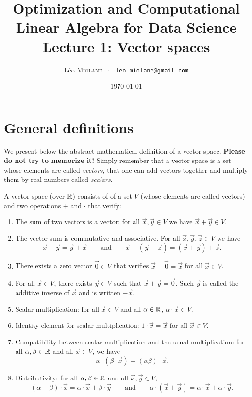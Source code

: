 \documentclass[11pt,nocut]{article}
\title{\vspace{-2.0cm}%
	Optimization and Computational Linear Algebra for Data Science\\
	Lecture 1: Vector spaces}
\author{Léo \textsc{Miolane} \ $\cdot$ \ \texttt{leo.miolane@gmail.com}}
\date{\today}
\begin{document}
\maketitle

\section{General definitions}

We present below the abstract mathematical definition of a vector space. 
\textbf{Please do not try to memorize it!} 
Simply remember that a vector space is a set whose elements are called \emph{vectors}, that one can add vectors together and multiply them by real numbers called \emph{scalars}.
\begin{definition}
	A vector space (over $\mathbb{R}$) consists of of a set $V$ (whose elements are called vectors) and two operations $+$ and $\cdot$ that verify:
	\begin{enumerate}
		\item The sum of two vectors is a vector: for all $\vec{x},\vec{y} \in V$ we have $\vec{x}+\vec{y} \in V$.
		\item The vector sum is commutative and associative. For all $\vec{x},\vec{y},\vec{z} \in V$ we have
			$$
			\vec{x}+\vec{y} = \vec{y} + \vec{x} \qquad \text{and} \qquad \vec{x} + (\vec{y} + \vec{z}) = (\vec{x}+\vec{y}) + \vec{z}.
			$$
		\item There exists a zero vector $\vec{0} \in V$ that verifies $\vec{x} + \vec{0} = \vec{x}$ for all $\vec{x} \in V$.
		\item For all $\vec{x} \in V$, there exists $\vec{y} \in V$ such that $\vec{x} + \vec{y} = \vec{0}$. Such $\vec{y}$ is called the additive inverse of $\vec{x}$ and is written $- \vec{x}$.
		\item Scalar multiplication: for all $\vec{x} \in V$ and all $\alpha \in \mathbb{R}$, $\alpha \cdot \vec{x} \in V$.
		\item Identity element for scalar multiplication: $1 \cdot \vec{x} = \vec{x}$ for all $\vec{x} \in V$.
		\item Compatibility between scalar multiplication and the usual multiplication: for all $\alpha,\beta \in \mathbb{R}$ and all $\vec{x} \in V$, we have
			$$
			\alpha \cdot(\beta \cdot \vec{x}) = (\alpha \beta) \cdot \vec{x}.
			$$
		\item Distributivity: for all $\alpha,\beta \in \mathbb{R}$ and all $\vec{x},\vec{y} \in V$,
			$$
			(\alpha + \beta) \cdot \vec{x} = \alpha \cdot \vec{x} + \beta \cdot \vec{y}
			\qquad \text{and} \qquad
			\alpha \cdot (\vec{x} + \vec{y}) = \alpha \cdot \vec{x} + \alpha \cdot \vec{y}.
			$$
	\end{enumerate}
\end{definition}
\end{document}
